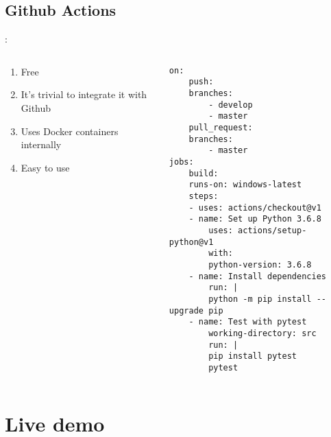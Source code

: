 \documentclass{beamer}
\begin{document}
\subsection{Github Actions}
\begin{frame}[fragile]{\secname : \subsecname}

\begin{columns}
\begin{column}{0.3\textwidth}

\begin{enumerate}
    \item Free
    \item It's trivial to integrate it with Github
    \item Uses Docker containers internally
    \item Easy to use
\end{enumerate}
\end{column}

\begin{column}{0.7\textwidth}

\begin{tiny}
\begin{verbatim}
on:
    push:
    branches: 
        - develop
        - master
    pull_request:
    branches: 
        - master
jobs:
    build:
    runs-on: windows-latest
    steps:
    - uses: actions/checkout@v1
    - name: Set up Python 3.6.8
        uses: actions/setup-python@v1
        with:
        python-version: 3.6.8
    - name: Install dependencies
        run: |
        python -m pip install --upgrade pip
    - name: Test with pytest
        working-directory: src
        run: |
        pip install pytest
        pytest

\end{verbatim}
\end{tiny}

\end{column}
\end{columns}
\end{frame}


\section{Live demo}
\end{document}
